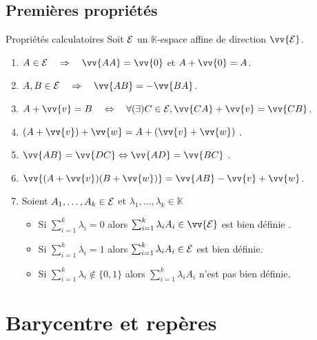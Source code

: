 \documentclass[
bigger]{m53beamer}
\begin{document}
\subsection{Premières propriétés}
  \begin{frame}{Propriétés calculatoires}
    Soit $\mathcal{E}$ un $\mathbb{K}$-espace affine de direction $\vv{\ens{E}}$.
    \begin{enumerate}[<+(1)->]
      \item $A \in \ens{E} \quad\Rightarrow\quad \vv{AA}=\vv{0}$ et $A+\vv{0}=A$.
      \item $A,B \in \ens{E} \quad\Rightarrow\quad \vv{AB}=-\vv{BA}$.
      \item $A+\vv{v}=B  \quad\Leftrightarrow\quad \forall (\exists) C \in \ens{E}, \vv{CA}+\vv{v}=\vv{CB}$.
      \item $(A+\vv{v})+\vv{w}=A+(\vv{v}+\vv{w})$ .
      \item $\vv{AB}=\vv{DC} \Leftrightarrow \vv{AD}=\vv{BC}$ .
      \item $\vv{(A+\vv{v})(B+\vv{w})}=\vv{AB}-\vv{v}+\vv{w}$.
      \item Soient $A_{1},\ldots,A_{k} \in \mathcal{E}$ et $\lambda_{1},\ldots,\lambda_{k} \in \mathbb{K}$
        \begin{itemize}[<+(1)->]
          \item Si $\sum_{i=1}^{k}\lambda_{i}=0$ alors $\sum_{i=1}^{k}\lambda_{i}A_{i} \in \vv{\ens{E}}$ est bien définie .
          \item Si $\sum_{i=1}^{k}\lambda_{i}=1$ alors $\sum_{i=1}^{k}\lambda_{i}A_{i} \in \mathcal{E}$ est bien définie.
          \item Si $\sum_{i=1}^{k}\lambda_{i}\notin \{0,1\}$ alors $\sum_{i=1}^{k}\lambda_{i}A_{i}$ n'est pas bien définie.
        \end{itemize}\pause
    \end{enumerate}
  \end{frame}
\section{Barycentre et repères}
\end{document}
